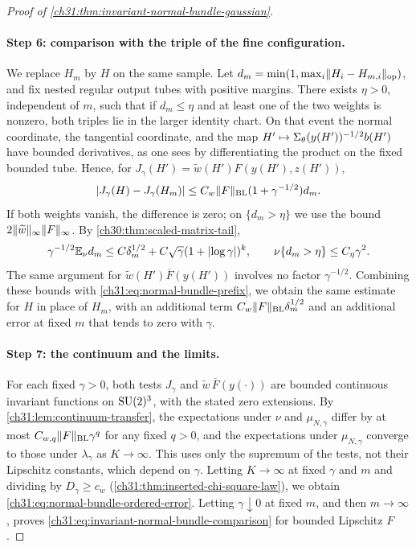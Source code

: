 \begin{proof}[Proof of \cref{ch31:thm:invariant-normal-bundle-gaussian}]
\paragraph{Step 6: comparison with the triple of the fine configuration.}
We replace $H_m$ by $H$ on the same sample. Let $d_m=\min(1,\max_i\lVert H_i-H_{m,i}\rVert_{\rm op})$, and fix nested regular output tubes with positive margins. There exists $\eta>0$, independent of $m$, such that if $d_m\le\eta$ and at least one of the two weights is nonzero, both triples lie in the larger identity chart. On that event the normal coordinate, the tangential coordinate, and the map $H'\mapsto\Sigma_\theta(y(H'))^{-1/2}b(H')$ have bounded derivatives, as one sees by differentiating the product on the fixed bounded tube. Hence, for $J_\gamma(H')=\widetilde w(H')F(y(H'),z(H'))$,
\[
 \lvert J_\gamma(H)-J_\gamma(H_m)\rvert\le C_w\lVert F\rVert_{\rm BL}(1+\gamma^{-1/2})d_m.
\]
If both weights vanish, the difference is zero; on $\{d_m>\eta\}$ we use the bound $2\lVert \widetilde w\rVert_\infty\lVert F\rVert_\infty$. By \cref{ch30:thm:scaled-matrix-tail},
\[
 \gamma^{-1/2}\mathbb E_\nu d_m\le C\delta_m^{1/2}+C\sqrt\gamma(1+\lvert \log\gamma\rvert)^k,\qquad\nu\{d_m>\eta\}\le C_\eta\gamma^2.
\]
The same argument for $\widetilde w(H')\overline F(y(H'))$ involves no factor $\gamma^{-1/2}$. Combining these bounds with \eqref{ch31:eq:normal-bundle-prefix}, we obtain the same estimate for $H$ in place of $H_m$, with an additional term $C_w\lVert F\rVert_{\rm BL}\delta_m^{1/2}$ and an additional error at fixed $m$ that tends to zero with $\gamma$.

\paragraph{Step 7: the continuum and the limits.}
For each fixed $\gamma>0$, both tests $J_\gamma$ and $\widetilde w\,\overline F(y(\cdot))$ are bounded continuous invariant functions on $\mathrm{SU}(2)^3$, with the stated zero extensions. By \cref{ch31:lem:continuum-transfer}, the expectations under $\nu$ and $\mu_{N,\gamma}$ differ by at most $C_{w,q}\lVert F\rVert_{\rm BL}\gamma^q$ for any fixed $q>0$, and the expectations under $\mu_{N,\gamma}$ converge to those under $\lambda_\gamma$ as $K\to\infty$. This uses only the supremum of the tests, not their Lipschitz constants, which depend on $\gamma$. Letting $K\to\infty$ at fixed $\gamma$ and $m$ and dividing by $D_\gamma\ge c_w$ (\cref{ch31:thm:inserted-chi-square-law}), we obtain \eqref{ch31:eq:normal-bundle-ordered-error}. Letting $\gamma\downarrow0$ at fixed $m$, and then $m\to\infty$, proves \eqref{ch31:eq:invariant-normal-bundle-comparison} for bounded Lipschitz $F$.


\end{proof}
